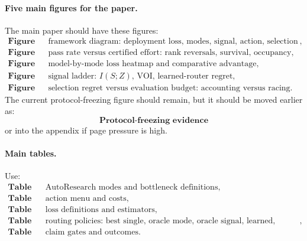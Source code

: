 \documentclass{article}
\begin{document}
\paragraph{Five main figures for the paper.}
The main paper should have these figures:
\[
\begin{array}{ll}
    \textbf{Figure 1} &
    \text{framework diagram: deployment loss, modes, signal, action, selection regret},\\
    \textbf{Figure 2} &
    \text{pass rate versus certified effort: rank reversals, survival, occupancy},\\
    \textbf{Figure 3} &
    \text{model-by-mode loss heatmap and comparative advantage},\\
    \textbf{Figure 4} &
    \text{signal ladder: \(I(S;Z)\), VOI, learned-router regret},\\
    \textbf{Figure 5} &
    \text{selection regret versus evaluation budget: accounting versus racing}.
\end{array}
\]
The current protocol-freezing figure should remain, but it should be moved earlier as:
\[
    \textbf{Protocol-freezing evidence}
\]
or into the appendix if page pressure is high.

\paragraph{Main tables.}
Use:
\[
\begin{array}{ll}
    \textbf{Table 1} & \text{AutoResearch modes and bottleneck definitions},\\
    \textbf{Table 2} & \text{action menu and costs},\\
    \textbf{Table 3} & \text{loss definitions and estimators},\\
    \textbf{Table 4} & \text{routing policies: best single, oracle mode, oracle signal,
    learned, controls},\\
    \textbf{Table 5} & \text{claim gates and outcomes}.
\end{array}
\]
\end{document}
